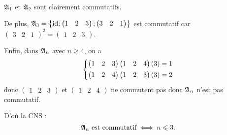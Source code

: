 \begin{corr}[3]
\(\frak{A}_{1}\) et \(\frak{A}_{2}\) sont clairement commutatifs.

De plus, \(\frak{A}_{3}=\left\lbrace\mathrm{id}_{};\begin{pmatrix}1 & 2 & 3\end{pmatrix};\begin{pmatrix}3 & 2 & 1\end{pmatrix}\right\rbrace\) est commutatif car \(\begin{pmatrix}3 & 2 & 1\end{pmatrix}^2=\begin{pmatrix}1 & 2 & 3\end{pmatrix}\).

Enfin, dans \(\frak{A}_{n}\) avec \(n\geq4\), on a \[\begin{dcases}
\begin{pmatrix}1 & 2 & 3\end{pmatrix}\begin{pmatrix}1 & 2 & 4\end{pmatrix}\left(3\right)=1 \\
\begin{pmatrix}1 & 2 & 4\end{pmatrix}\begin{pmatrix}1 & 2 & 3\end{pmatrix}\left(3\right)=2
\end{dcases}\] donc \(\begin{pmatrix}1 & 2 & 3\end{pmatrix}\) et \(\begin{pmatrix}1 & 2 & 4\end{pmatrix}\) ne commutent pas donc \(\frak{A}_{n}\) n'est pas commutatif.

D'où la CNS : \[\frak{A}_{n}\text{ est commutatif}\iff n\leqslant3.\]
\end{corr}

